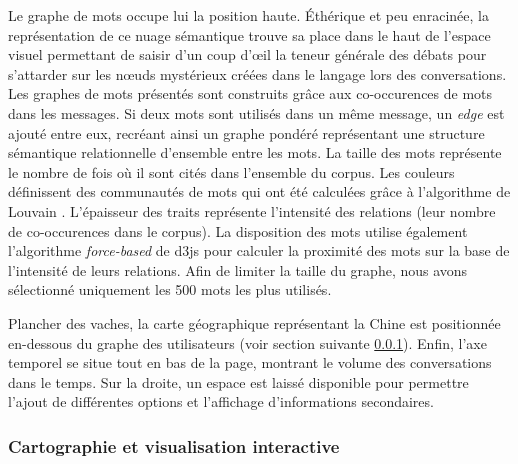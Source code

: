     Le graphe de mots occupe lui la position haute. Éthérique et peu enracinée, la représentation de ce nuage sémantique trouve sa place dans le haut de l'espace visuel permettant de saisir d'un coup d’œil la teneur générale des débats pour s'attarder sur les nœuds mystérieux créées dans le langage lors des conversations. Les graphes de mots présentés sont construits gr\^ace aux co-occurences de mots dans les messages. Si deux mots sont utilisés dans un m\^eme message, un \textit{edge} est ajouté entre eux, recréant ainsi un graphe pondéré représentant une structure sémantique relationnelle d{\textquoteright}ensemble entre les mots. La taille des mots représente le nombre de fois o\`u il sont cités dans l{\textquoteright}ensemble du corpus. Les couleurs définissent des communautés de mots qui ont été calculées gr\^ace à l{\textquoteright}algorithme de Louvain \citep{Blondel2008}. L{\textquoteright}épaisseur des traits représente l{\textquoteright}intensité des relations (leur nombre de co-occurences dans le corpus). La disposition des mots utilise également l{\textquoteright}algorithme \textit{force-based} de d3js \citep{Bostock2011} pour calculer la proximité des mots sur la base de l{\textquoteright}intensité de leurs relations. Afin de limiter la taille du graphe, nous avons sélectionné uniquement les 500 mots les plus utilisés.  


    Plancher des vaches, la carte géographique représentant la Chine est positionnée en-dessous du graphe des utilisateurs (voir section suivante \ref{sec:le_temps_et_la_carte}). Enfin, l'axe temporel se situe tout en bas de la page, montrant le volume des conversations dans le temps. Sur la droite, un espace est laissé disponible pour permettre l'ajout de différentes options et l'affichage d'informations secondaires.
    

\subsubsection{Cartographie et visualisation interactive} 
\label{sec:le_temps_et_la_carte}
    
